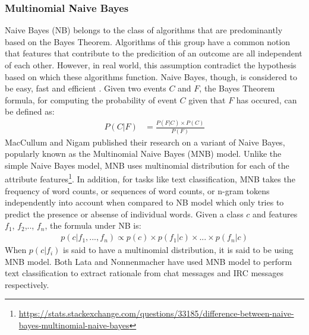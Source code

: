 \documentclass[a4paper,12pt,twoside]{report}
\begin{document}
\subsubsection{Multinomial Naive Bayes}
Naive Bayes (NB) belongs to the class of algorithms that are predominantly based on the Bayes Theorem. Algorithms of this group have a common notion that features that contribute to the predicition of an outcome are all independent of each other. However, in real world, this assumption contradict the hypothesis based on which these algorithms function. Naive Bayes, though, is considered to be easy, fast and efficient \cite{Rennie2003}. 
\newline \newline
Given two events $C$ and $F$, the Bayes Theorem formula, for computing the probability of event $C$ given that $F$ has occured, can be defined as: 
\begin{align*}
P(C|F) &= \frac{P(F|C) \times P(C)}{P(F)}
\end{align*}
\newline \newline
MacCullum and Nigam \cite{McCallum1998a} published their research on a variant of Naive Bayes, popularly known as the Multinomial Naive Bayes (MNB) model. Unlike the simple Naive Bayes model, MNB uses multinomial distribution for each of the attribute features\footnote{\url{https://stats.stackexchange.com/questions/33185/difference-between-naive-bayes-multinomial-naive-bayes}}. In addition, for tasks like text classification, MNB takes the frequency of word counts, or sequences of word counts, or n-gram tokens independently into account when compared to NB model which only tries to predict the presence or absense of individual words. 
\newline \newline
Given a class $c$ and features $f_1$, $f_2$,.., $f_n$, the formula under NB is:
\begin{align*}
p(c|f_1,...,f_n) \propto p(c) \times p(f_1|c) \times ... \times p(f_n|c)
\end{align*}
\newline \newline
When $p(c|f_i)$ is said to have a multinomial distribution, it is said to be using MNB model.  
\newline \newline
Both Lata \cite{Lata2016} and Nonnenmacher\cite{Nonnenmacher2017} have used MNB model to perform text classification to extract rationale from chat messages and IRC messages respectively. 
\end{document}
